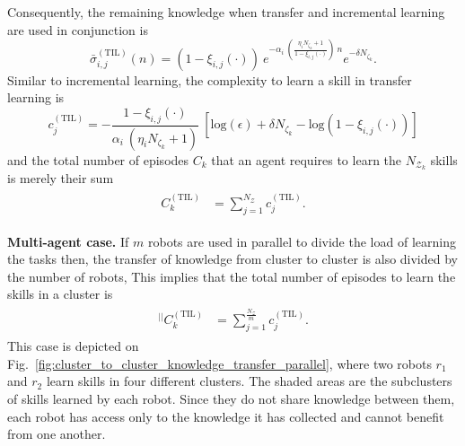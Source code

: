 Consequently, the remaining knowledge when transfer and incremental learning are used in conjunction is
\begin{equation}\label{eq:remaining_knowledge__ITL}
	\bar{\sigma}^{(\text{TIL})}_{i,j}(n) = \left(1- \xi_{i,j}(\cdot) \right)\: e^{-\alpha_i \: \left(\frac{ \eta_i N_{\zeta_k}+1}{1 - \xi_{i,j}(\cdot)}\right) \:n} e^{-\delta N_{\zeta_k}}.
\end{equation}
Similar to incremental learning, the complexity to learn a skill in transfer learning is
\begin{equation}\label{eq:skill_complexity_TL}
	c^{(\text{TIL})}_{j} = -\frac{1 - \xi_{i,j}(\cdot)}{\alpha_i\: (\eta_i N_{\zeta_k}+ 1)}\:\left[\text{log}(\epsilon) + \delta N_{\zeta_k} - \text{log}(1 - \xi_{i,j}(\cdot))\right]
\end{equation}
and the total number of episodes  $ C_k $ that an agent requires to learn the $N_{\mathcal{Z}_k}$ skills is merely their sum
\begin{align}\label{eq:total_episodes_transfer}
	\begin{split}
		C^{(\text{TIL})}_k &= \sum^{N_{\mathcal{Z}}}_{j=1} c^{(\text{TIL})}_{j}.
	\end{split}
\end{align}

\textbf{Multi-agent case.} If $m$ robots are used in parallel to divide the load of learning the tasks then, the transfer of knowledge from cluster to cluster is also divided by the number of robots, This implies that the total number of episodes to learn the skills in a cluster is
\begin{align}
	\begin{split}
		{}^{\lvert \rvert}C^{(\text{TIL})}_k &= \sum^{\frac{N_{\mathcal{Z}}}{m}}_{j=1} c^{(\text{TIL})}_{j}.
	\end{split}
\end{align}
This case is depicted on Fig.~\ref{fig:cluster_to_cluster_knowledge_transfer_parallel}, where two robots $ r_1$ and $r_2$ learn skills in four different clusters. The shaded areas are the subclusters of skills learned by each robot. Since they do not share knowledge between them, each robot has access only to the knowledge it has collected and cannot benefit from one another. 


\newpage
